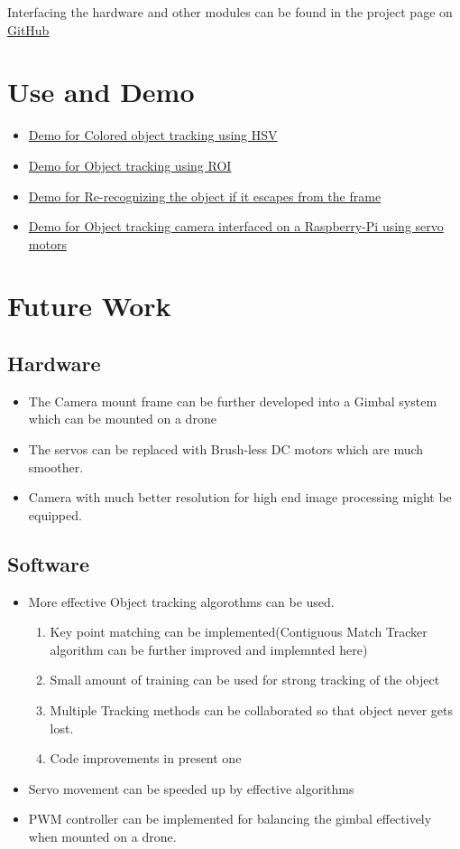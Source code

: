 \documentclass[a4paper,12pt,oneside]{book}
\begin{document}
Interfacing the hardware and other modules can be found in the project page on \href{https://github.com/eYSIP-2016/Object-Tracking-Camera}{GitHub}

\section{Use and Demo}
\begin{itemize}
    \item \href{https://youtu.be/hWcxEkWLm9o}{Demo for Colored object tracking using HSV }
    \item \href{https://youtu.be/bytE1EegAfg}{Demo for Object tracking using ROI}
    \item \href {https://youtu.be/M2SsABMLuCQ}{Demo for Re-recognizing the object if it escapes from the frame}
    \item \href{https://youtu.be/8CXhzPhfl64}{Demo for Object tracking camera interfaced on a Raspberry-Pi using servo motors}
\end{itemize}

\section{Future Work}
\subsection{Hardware}
\begin{itemize}
    \item The Camera mount frame can be further developed into a Gimbal system which can be mounted on a drone
    \item The servos can be replaced with Brush-less DC motors which are much smoother.
    \item Camera with much better resolution for high end image processing might be equipped.
\end{itemize}
\subsection{Software}
\begin{itemize}
    \item More effective Object tracking algorothms can be used.
        \begin{enumerate}
            \item Key point matching can be implemented(Contiguous Match Tracker algorithm can be further improved and implemnted here)
            \item Small amount of training can be used for strong tracking of the object
            \item Multiple Tracking methods can be collaborated so that object never gets lost.
            \item Code improvements in present one
        \end{enumerate} 
    \item Servo movement can be speeded up by effective algorithms
    \item PWM controller can be implemented for balancing the gimbal effectively when mounted on a drone.
\end{itemize}
\end{document}
